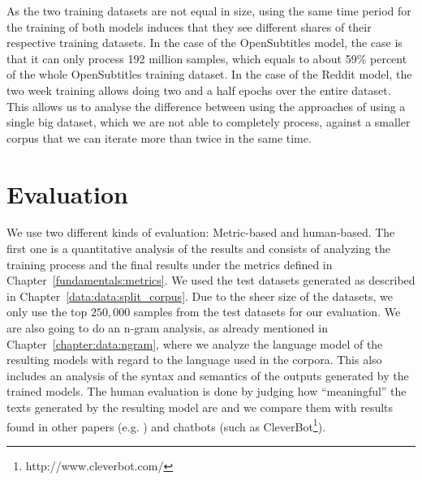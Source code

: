 As the two training datasets are not equal in size, using the same time period for the training of both models induces that they see different shares of their respective training datasets. In the case of the OpenSubtitles model, the case is that it can only process 192 million samples, which equals to about 59\% percent of the whole OpenSubtitles training dataset. In the case of the Reddit model, the two week training allows doing two and a half epochs over the entire dataset. This allows us to analyse the difference between using the approaches of using a single big dataset, which we are not able to completely process, against a smaller corpus that we can iterate more than twice in the same time.

\section{Evaluation}
\label{methods:evaluation}
We use two different kinds of evaluation: Metric-based and human-based. The first one is a quantitative analysis of the results and consists of analyzing the training process and the final results under the metrics defined in Chapter~\ref{fundamentals:metrics}. We used the test datasets generated as described in Chapter~\ref{data:data:split_corpus}. Due to the sheer size of the datasets, we only use the top $250,000$ samples from the test datasets for our evaluation. We are also going to do an n-gram analysis, as already mentioned in Chapter~\ref{chapter:data:ngram}, where we analyze the language model of the resulting models with regard to the language used in the corpora. This also includes an analysis of the syntax and semantics of the outputs generated by the trained models. The human evaluation is done by judging how ``meaningful'' the texts generated by the resulting model are and we compare them with results found in other papers (e.g. \cite{Vinyals:2015}) and chatbots (such as CleverBot\footnote{http://www.cleverbot.com/}).

